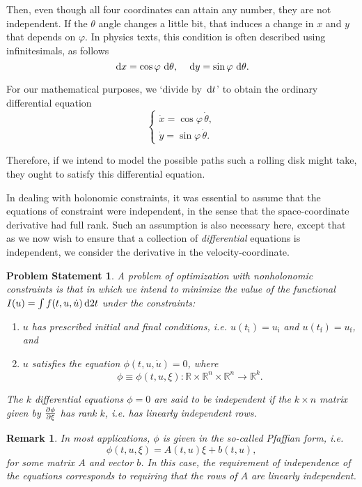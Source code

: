 \documentclass{article}
\theoremstyle{plain}
\theoremstyle{plain}
\newtheorem{remark}{Remark}
\theoremstyle{nonumberplain}
\newtheorem{statement}{Problem Statement}
\theoremstyle{empty}
\newcommand{\R}{\mathbb{R}}
\newcommand{\tstart}{\mathrm{i}}
\newcommand{\tend}{\mathrm{f}}
\begin{document}
Then, even though all four coordinates can attain any number, they are not independent. If the $\theta$ angle changes a little bit, that induces a change in $x$ and $y$ that depends on $\varphi$. In physics texts, this condition is often described using infinitesimals, as follows
\[\dl x = \cos \varphi \, \dl \theta, \quad \dl y = \sin \varphi \, \dl \theta.\]

For our mathematical purposes, we `divide by $\dl t$' to obtain the ordinary differential equation
\[
\begin{cases}
\dot x = \cos \varphi \, \dot \theta,\\
\dot y = \sin \varphi \, \dot \theta.
\end{cases}
\]

Therefore, if we intend to model the possible paths such a rolling disk might take, they ought to satisfy this differential equation.

In dealing with holonomic constraints, it was essential to assume that the equations of constraint were independent, in the sense that the space-coordinate derivative had full rank. Such an assumption is also necessary here, except that  as we now wish to ensure that a collection of \emph{differential} equations is independent, we consider the derivative in the velocity-coordinate.

\begin{statement}
A problem of optimization with nonholonomic constraints is that in which we intend to minimize the value of the functional $I(u) = \int f(t, u, \dot u) \dl2 t$ under the constraints:
\begin{enumerate}
\item $u$ has prescribed initial and final conditions, i.e. $u(t_\tstart) = u_\tstart$ and $u(t_\tend) = u_\tend$, and
\item $u$ satisfies the equation $\phi(t,u,\dot u) = 0$, where
\[\phi \equiv \phi(t, u, \xi) \colon \R \times \R^n \times \R^n \to \R^k.\]
\end{enumerate}

The $k$ differential equations $\phi = 0$ are said to be \emph{independent} if the $k \times n$ matrix given by $\diffp \phi \xi$ has rank $k$, i.e. has linearly independent rows.
\end{statement}

\begin{remark}\label{pfaffian}
In most applications, $\phi$ is given in the so-called Pfaffian form, i.e.
\[\phi(t,u,\xi) = A(t,u) \xi + b(t,u),\]
for some matrix $A$ and vector $b$. In this case, the requirement of independence of the equations corresponds to requiring that the rows of $A$ are linearly independent.
\end{remark}
\end{document}
